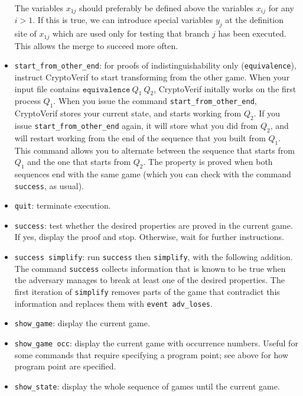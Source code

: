 \documentclass{article}
\begin{document}
\begin{itemize}
  The variables $x_{1j}$ should preferably be defined above the
  variables $x_{ij}$ for any $i > 1$. If this is true, we can
  introduce special variables $y_j$ at the definition site of $x_{1j}$
  which are used only for testing that branch $j$ has been executed.
  This allows the merge to succeed more often.

\item \texttt{start\_from\_other\_end}: for proofs of indistinguishability
  only (\texttt{equivalence}), instruct CryptoVerif to start transforming
  from the other game. When your input file contains
  $\texttt{equivalence}\ Q_1\ Q_2$, CryptoVerif initally works on the first  
  process $Q_1$. When you issue the command \texttt{start\_from\_other\_end},
  CryptoVerif stores your current state, and starts working from $Q_2$.
  If you issue \texttt{start\_from\_other\_end} again, it will store
  what you did from $Q_2$, and will restart working from the end of the
  sequence that you built from $Q_1$. This command allows you to
  alternate between the sequence that starts from $Q_1$ and the one that
  starts from $Q_2$. The property is proved when both sequences end with the
  same game (which you can check with the command \texttt{success}, as usual).
  
\item \texttt{quit}: terminate execution.

\item \texttt{success}: test whether the desired properties are
proved in the current game. If yes, display the proof and stop.
Otherwise, wait for further instructions.

\item \texttt{success simplify}: run \texttt{success} then \texttt{simplify}, with the following addition. The command \texttt{success} collects information that is known to be true when the adversary manages to break at least one of the desired properties. The first iteration of \texttt{simplify} removes parts of the game that contradict this information and replaces them with \texttt{event adv\_loses}.

\item \texttt{show\string_game}: display the current game.

\item \texttt{show\string_game occ}: display the current game with
  occurrence numbers. Useful for some commands that require specifying a
  program point; see above for how program point are specified.

\item \texttt{show\string_state}: display the whole sequence
of games until the current game.


\end{itemize}
\end{document}
